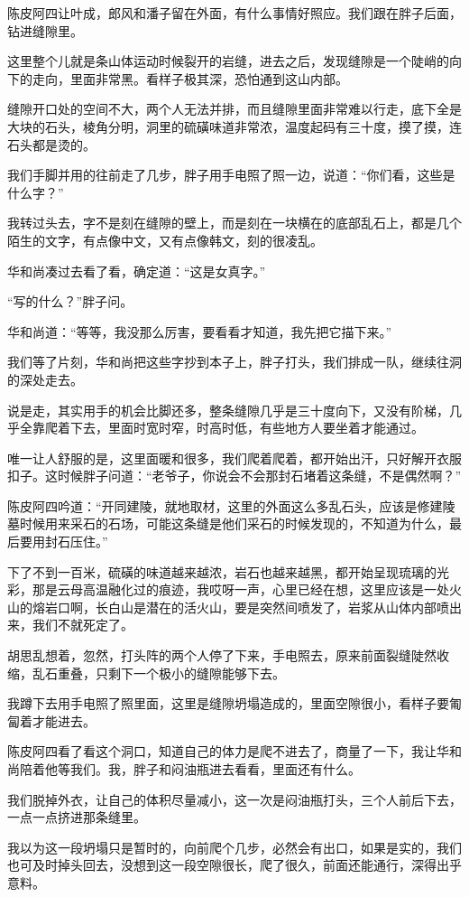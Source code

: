 陈皮阿四让叶成，郎风和潘子留在外面，有什么事情好照应。我们跟在胖子后面，钻进缝隙里。

这里整个儿就是条山体运动时候裂开的岩缝，进去之后，发现缝隙是一个陡峭的向下的走向，里面非常黑。看样子极其深，恐怕通到这山内部。

缝隙开口处的空间不大，两个人无法并排，而且缝隙里面非常难以行走，底下全是大块的石头，棱角分明，洞里的硫磺味道非常浓，温度起码有三十度，摸了摸，连石头都是烫的。

我们手脚并用的往前走了几步，胖子用手电照了照一边，说道：“你们看，这些是什么字？”

我转过头去，字不是刻在缝隙的壁上，而是刻在一块横在的底部乱石上，都是几个陌生的文字，有点像中文，又有点像韩文，刻的很凌乱。

华和尚凑过去看了看，确定道：“这是女真字。”

“写的什么？”胖子问。

华和尚道：“等等，我没那么厉害，要看看才知道，我先把它描下来。”

我们等了片刻，华和尚把这些字抄到本子上，胖子打头，我们排成一队，继续往洞的深处走去。

说是走，其实用手的机会比脚还多，整条缝隙几乎是三十度向下，又没有阶梯，几乎全靠爬着下去，里面时宽时窄，时高时低，有些地方人要坐着才能通过。

唯一让人舒服的是，这里面暖和很多，我们爬着爬着，都开始出汗，只好解开衣服扣子。这时候胖子问道：“老爷子，你说会不会那封石堵着这条缝，不是偶然啊？”

陈皮阿四吟道：“开同建陵，就地取材，这里的外面这么多乱石头，应该是修建陵墓时候用来采石的石场，可能这条缝是他们采石的时候发现的，不知道为什么，最后要用封石压住。”

下了不到一百米，硫磺的味道越来越浓，岩石也越来越黑，都开始呈现琉璃的光彩，那是云母高温融化过的痕迹，我哎呀一声，心里已经在想，这里应该是一处火山的熔岩口啊，长白山是潜在的活火山，要是突然间喷发了，岩浆从山体内部喷出来，我们不就死定了。

胡思乱想着，忽然，打头阵的两个人停了下来，手电照去，原来前面裂缝陡然收缩，乱石重叠，只剩下一个极小的缝隙能够下去。

我蹲下去用手电照了照里面，这里是缝隙坍塌造成的，里面空隙很小，看样子要匍匐着才能进去。

陈皮阿四看了看这个洞口，知道自己的体力是爬不进去了，商量了一下，我让华和尚陪着他等我们。我，胖子和闷油瓶进去看看，里面还有什么。

我们脱掉外衣，让自己的体积尽量减小，这一次是闷油瓶打头，三个人前后下去，一点一点挤进那条缝里。

我以为这一段坍塌只是暂时的，向前爬个几步，必然会有出口，如果是实的，我们也可及时掉头回去，没想到这一段空隙很长，爬了很久，前面还能通行，深得出乎意料。

